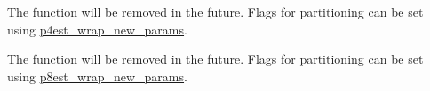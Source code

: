 
\begin{DoxyRefList}
\item[Global \mbox{\hyperlink{p4est__wrap_8h_a942de3e74af733898264069e74802415}{p4est\+\_\+wrap\+\_\+set\+\_\+partitioning}} (p4est\+\_\+wrap\+\_\+t $\ast$pp, int partition\+\_\+for\+\_\+coarsening)]\label{deprecated__deprecated000001}%
%
The function will be removed in the future. Flags for partitioning can be set using \mbox{\hyperlink{p4est__wrap_8h_a60f9882a9fa246c153dd82068c467303}{p4est\+\_\+wrap\+\_\+new\+\_\+params}}. 
\item[Global \mbox{\hyperlink{p8est__wrap_8h_a32f35c3f173165a3e8faab19ba0a1a99}{p8est\+\_\+wrap\+\_\+set\+\_\+partitioning}} (p8est\+\_\+wrap\+\_\+t $\ast$pp, int partition\+\_\+for\+\_\+coarsening)]\label{deprecated__deprecated000002}%
%
The function will be removed in the future. Flags for partitioning can be set using \mbox{\hyperlink{p8est__wrap_8h_af205c54b0e045f94ae6768a7481e5aec}{p8est\+\_\+wrap\+\_\+new\+\_\+params}}.
\end{DoxyRefList}